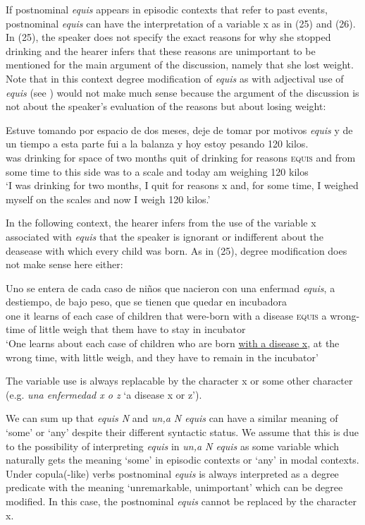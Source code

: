 \documentclass[output=paper
,modfonts
,nonflat]{langsci/langscibook}
\begin{document}
If postnominal \textit{equis} appears in episodic contexts that refer to past events, postnominal \textit{equis} can have the interpretation of a variable x as in (25) and (26). In (25), the speaker does not specify the exact reasons for why she stopped drinking and the hearer infers that these reasons are unimportant to be mentioned for the main argument of the discussion, namely that she lost weight. Note that in this context degree modification of \textit{equis} as with adjectival use of \textit{equis} (see ) would not make much sense because the argument of the discussion is not about the speaker's evaluation of the reasons but about losing weight:

\ea
\gll  Estuve tomando por espacio de dos meses, deje de tomar por motivos \textit{equis} y de un tiempo a esta parte fui a la balanza y hoy estoy pesando 120 kilos.\\
was drinking for space of two months quit of drinking for reasons \textsc{equis} and from some time to this side was to a scale and today am weighing 120 kilos\\
\glt ‘I was drinking for two months, I quit for reasons x and, for some time, I weighed myself on the scales and now I weigh 120 kilos.’
\z

In the following context, the hearer infers from the use of the variable x associated with \textit{equis} that the speaker is ignorant or indifferent about the deasease with which every child was born. As in (25), degree modification does not make sense here either:

\ea
\gll  Uno se entera de cada caso de niños que nacieron con una enfermad \textit{equis}, a destiempo, de bajo peso, que se tienen que quedar en incubadora\\
one it learns of each case of children that were-born with a disease \textsc{equis} a wrong-time of little weigh that them have to stay in incubator\\
\glt ‘One learns about each case of children who are born \underline{with a disease x}, at the wrong time, with little weigh, and they have to remain in the incubator’
\z

The variable use is always replacable by the character x or some other character (e.g. \textit{una enfermedad x o z} ‘a disease x or z’).

We can sum up that \textit{equis N} and \textit{un,a N equis} can have a similar meaning of ‘some’ or ‘any’ despite their different syntactic status. We assume that this is due to the possibility of interpreting \textit{equis} in \textit{un,a N equis} as some variable which naturally gets the meaning ‘some’ in episodic contexts or ‘any’ in modal contexts. Under copula(-like) verbs postnominal \textit{equis} is always interpreted as a degree predicate with the meaning ‘unremarkable, unimportant’ which can be degree modified. In this case, the postnominal \textit{equis} cannot be replaced by the character x.
\end{document}
